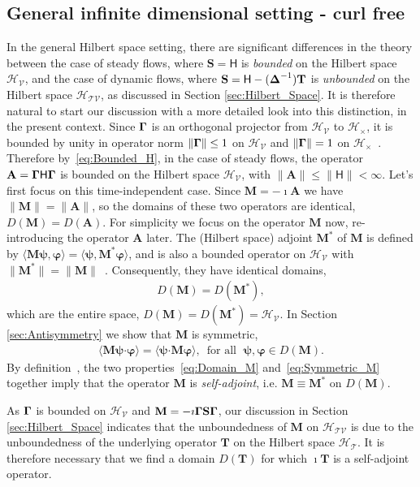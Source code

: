 \documentclass[leqno,onefignum,onetabnum]{siamltex1213}
\newcommand{\Mb}{\mathbf{M}}
\newcommand{\Tb}{\mathbf{T}}
\newcommand{\Sb}{\mathbf{S}}
\newcommand{\Ab}{\mathbf{A}}
\newcommand{\Tc}{\mathcal{T}}
\newcommand{\Vc}{\mathcal{V}}
\newcommand{\Hc}{\mathcal{H}}
\newcommand{\Hm}{\mathsf{H}}
\newcommand\bDelta{\mbox{\boldmath${\Delta}$}}
\newcommand\bGamma{\mbox{\boldmath${\Gamma}$}}
\providecommand\bcdot{\boldsymbol{\cdot}}
\newcommand{\vecpsi}{\boldsymbol{\psi}}
\newcommand{\vecvarphi}{\boldsymbol{\varphi}}
\begin{document}
\subsection{General infinite dimensional setting - curl free}
\label{sec:Integral_Rep_General_curl_free}
%
In the general Hilbert space setting, there are significant
differences in the theory between the case of steady flows, where
$\Sb=\Hm$ is \emph{bounded} on the Hilbert space $\Hc_{\Vc}$, and
the case of dynamic flows, where $\Sb=\Hm-(\bDelta^{-1})\Tb$ is
\emph{unbounded} on the Hilbert space $\Hc_{\Tc\Vc}$, as discussed in
Section \ref{sec:Hilbert_Space}. It is therefore natural to start our
discussion with a more detailed look into this distinction, in the
present context. Since $\bGamma$ is an orthogonal projector from
$\Hc_{\Vc}$ to $\Hc_\times$, it is bounded by unity in operator norm
$\|\bGamma\|\leq1$ on $\Hc_{\Vc}$ and $\|\bGamma\|=1$ on
$\Hc_\times$~\cite{Reed-1980,Stone:64}. Therefore by~\eqref{eq:Bounded_H},
in the 
case of  steady flows, the operator $\Ab=\bGamma\Hm\bGamma$ is bounded
on the Hilbert space $\Hc_{\Vc}$, with $\|\Ab\|\leq\|\Hm\|<\infty$. Let's first
focus on this time-independent case. Since $\Mb=-\imath\Ab$ we have 
$\|\Mb\|=\|\Ab\|$, so the domains of these two operators are identical,
$D(\Mb)=D(\Ab)$. For simplicity we focus on the operator $\Mb$ now,
re-introducing the operator $\Ab$ later. The (Hilbert space)
adjoint $\Mb^*$ of $\Mb$ is defined by
$\langle\Mb\vecpsi,\vecvarphi\rangle=\langle\vecpsi,\Mb^*\vecvarphi\rangle$, and is also a
bounded operator on $\Hc_{\Vc}$ with
$\|\Mb^*\|=\|\Mb\|$~\cite{Reed-1980}. Consequently, they have identical
domains,        
%
\begin{align}%
  D(\Mb)=D(\Mb^*),
\end{align}
%
which are the entire space, $D(\Mb)=D(\Mb^*)=\Hc_{\Vc}$. In
Section \ref{sec:Antisymmetry} we show that $\Mb$ is symmetric,
%
\begin{align}%
  \langle\Mb\vecpsi\bcdot\vecvarphi\rangle=\langle\vecpsi\bcdot\Mb\vecvarphi\rangle,
  \, \text{ for all } \; \vecpsi,\vecvarphi\in D(\Mb).
\end{align}
%
By definition~\cite{Reed-1980,Stone:64}, the two
properties~\eqref{eq:Domain_M} and~\eqref{eq:Symmetric_M} together
imply that the operator $\Mb$ is \emph{self-adjoint}, i.e. $\Mb\equiv\Mb^*$
on $D(\Mb)$. 






As $\bGamma$ is bounded on $\Hc_{\Vc}$ and
$\Mb=-\imath\bGamma\Sb\bGamma$, our discussion in Section
\ref{sec:Hilbert_Space} indicates that the unboundedness of $\Mb$ on
$\Hc_{\Tc\Vc}$ is due to the unboundedness of the underlying operator
$\Tb$ on the Hilbert space $\Hc_{\Tc}$. It is therefore necessary
that we find a domain $D(\Tb)$ for which $\imath\Tb$ is a self-adjoint
operator. 
\end{document}
